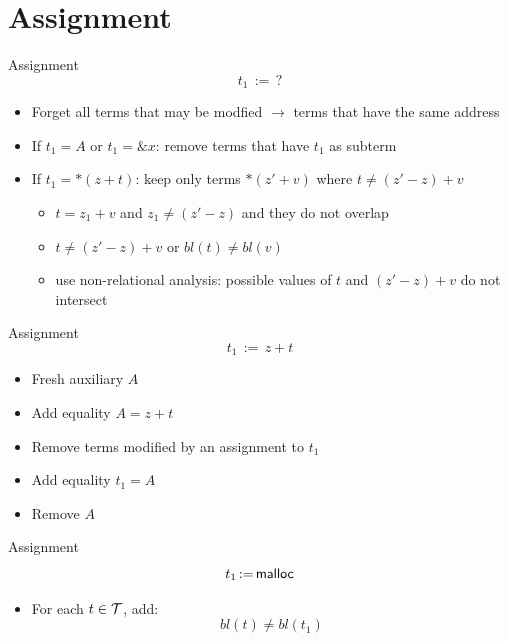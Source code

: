 \documentclass{beamer}
\begin{document}
\section{Assignment}

\begin{frame}{Assignment}
    \[
        t_1\,{:=}\,?
    \]
    \begin{itemize}
        \item Forget all terms that may be modfied $\rightarrow$ terms that have the same address
        \item If $t_1 = A$ or $t_1 = \&x$: remove terms that have $t_1$ as subterm
        \item If $t_1 = *(z + t)$: keep only terms $*(z' + v)$ where $t \neq (z' - z) + v$
              \begin{itemize}
                  \item $t = z_1 + v$ and $z_1 \neq (z' - z)$ and they do not overlap
                  \item $t \neq (z' - z) + v$ or $bl(t) \neq bl(v)$
                  \item use non-relational analysis: possible values of $t$ and $(z' - z) + v$ do not intersect
              \end{itemize}
    \end{itemize}
\end{frame}

\begin{frame}{Assignment}
    \[
        t_1\,{:=}\,z + t
    \]
    \begin{itemize}
       \item Fresh auxiliary $A$
       \item Add equality $A = z + t$
       \item Remove terms modified by an assignment to $t_1$
       \item Add equality $t_1 = A$
       \item Remove $A$
    \end{itemize}
\end{frame}

\begin{frame}{Assignment}
    \[
        t_1\,{:=}\,\textsf{malloc}
    \]
    \begin{itemize}
       \item For each $t \in \mathcal{T}$, add:
       \[
       bl(t) \neq bl(t_1)
       \]
    \end{itemize}
\end{frame}
\end{document}
